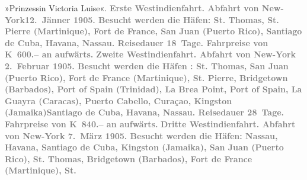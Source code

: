 \begin{ledgroupsized}[t]{13cm}
{{                  »Prinzessin Victoria Luise«.}}\pend
           \pstart
           \noindent{}\textcolor{gray}{\textbf{\textbf{Erste Westindienfahrt.} Abfahrt von New-York\textbf{12. Jänner 1905}. Besucht werden die Häfen: St. Thomas,
                     St. Pierre (Martinique), Fort de France, San Juan
                     (Puerto Rico), Santiago de Cuba, Havana, Nassau. Reisedauer 18 Tage. Fahrpreise von \textbf{K 600.–}
                  an aufwärts.}}\pend
           \pstart
           \textcolor{gray}{\textbf{\textbf{Zweite Westindienfahrt.} Abfahrt von New-York { }\textbf{2. Februar 1905}. Besucht werden die Häfen : St.
                  Thomas, San Juan (Puerto Rico), Fort de France (Martinique), St. Pierre, Bridgetown
                     (Barbados), Port of Spain
                  (Trinidad), La Brea Point, Port of Spain, La Guayra (Caracas), Puerto Cabello, Curaçao, Kingston (Jamaika)Santiago de Cuba, Havana, Nassau.
                  Reisedauer 28 Tage. Fahrpreise von \textbf{K 840.–} an aufwärts.}}\pend
           \pstart
           \textcolor{gray}{\textbf{\textbf{Dritte Westindienfahrt.} Abfahrt von New-York { }\textbf{7. März 1905}. Besucht werden die Häfen: Nassau, Havana, Santiago de Cuba, Kingston
                     (Jamaika), San Juan (Puerto Rico),
                     St. Thomas, Bridgetown (Barbados), Fort de France (Martinique), St.
}}
\end{ledgroupsized}
